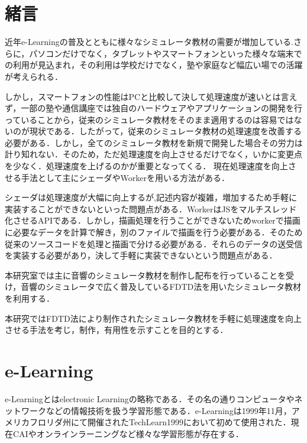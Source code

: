 \documentclass[a4j,12pt]{jsarticle}
\begin{document}
\setcounter{page}{1} %
\setcounter{tocdepth}{3}
\tableofcontents
\clearpage
\listoffigures
\clearpage
\listoftables
\clearpage


\newpage
{}
\setcounter{page}{1} 
\section{緒言}
近年e-Learningの普及とともに様々なシミュレータ教材の需要が増加している.さらに，パソコンだけでなく，タブレットやスマートフォンといった様々な端末での利用が見込まれ，その利用は学校だけでなく，塾や家庭など幅広い場での活躍が考えられる．

しかし，スマートフォンの性能はPCと比較して決して処理速度が速いとは言えず，一部の塾や通信講座では独自のハードウェアやアプリケーションの開発を行っていることから，従来のシミュレータ教材をそのまま適用するのは容易ではないのが現状である．したがって，従来のシミュレータ教材の処理速度を改善する必要がある．しかし，全てのシミュレータ教材を新規で開発した場合その労力は計り知れない．そのため，ただ処理速度を向上させるだけでなく，いかに変更点を少なく．処理速度を上げるのかが重要となってくる．
現在処理速度を向上させる手法として主にシェーダやWorkerを用いる方法がある．

シェーダは処理速度が大幅に向上するが,記述内容が複雑，増加するため手軽に実装することができないといった問題点がある．WorkerはJSをマルチスレッド化させるAPIである．しかし，描画処理を行うことができないためworkerで描画に必要なデータを計算で解き，別のファイルで描画を行う必要がある．そのため従来のソースコードを処理と描画で分ける必要がある．それらのデータの送受信を実装する必要があり，決して手軽に実装できないという問題点がある．

本研究室では主に音響のシミュレータ教材を制作し配布を行っていることを受け，音響のシミュレータで広く普及しているFDTD法を用いたシミュレータ教材を利用する．


本研究ではFDTD法により制作されたシミュレータ教材を手軽に処理速度を向上させる手法を考じ，制作，有用性を示すことを目的とする．

\newpage
\section{e-Learning}
e-Learningとはelectronic Learningの略称である．その名の通りコンピュータやネットワークなどの情報技術を扱う学習形態である．e-Learningは1999年11月，アメリカフロリダ州にて開催されたTechLearn1999において初めて使用された．現在CAIやオンラインラーニングなど様々な学習形態が存在する． 
\end{document}
